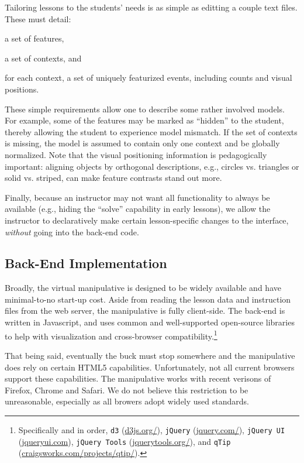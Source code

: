 \documentclass[11pt,letterpaper]{article}
\begin{document}
Tailoring lessons to the students' needs is as simple as editting a couple text files. These must detail:
\begin{inparaenum}[(1)]
\item a set of features, 
\item a set of contexts, and
\item for each context, a set of uniquely featurized events, including counts and visual positions.
\end{inparaenum}
These simple requirements allow one to describe some rather involved models. For example, some of 
the features may be marked as ``hidden'' to the student, thereby allowing the student to experience 
model mismatch. If the set of contexts is missing, the model is assumed to contain only 
one context and be globally normalized. Note that the visual positioning information is pedagogically 
important: aligning objects by orthogonal descriptions, e.g., circles vs. triangles or solid vs. striped, 
can make feature contrasts stand out more.

Finally, because an instructor may not want all functionality to always be available (e.g., hiding the ``solve''
capability in early lessons), we allow the instructor to declaratively make certain lesson-specific changes to 
the interface, \textit{without} going into the back-end code. 

\subsection{Back-End Implementation}
Broadly, the virtual manipulative is designed to be widely available and have minimal-to-no start-up cost. 
Aside from reading the lesson data and instruction files from the web server, the manipulative is fully 
client-side. The back-end is written in Javascript, and uses common and well-supported open-source 
libraries to help with visualization and cross-browser compatibility.\footnote{Specifically and in order, 
\texttt{d3} (\url{d3js.org/}),
\texttt{jQuery} (\url{jquery.com/}), 
\texttt{jQuery UI} (\url{jqueryui.com}),
\texttt{jQuery Tools} (\url{jquerytools.org/}), and
\texttt{qTip} (\url{craigsworks.com/projects/qtip/}).}

That being said, eventually the buck must stop somewhere and the manipulative does rely on certain HTML5 
capabilities. Unfortunately, not all current browsers support these capabilities. The manipulative works 
with recent verisons of Firefox, Chrome and Safari. We do not believe this restriction to be unreasonable, 
especially as all browers adopt widely used standards.
\end{document}
